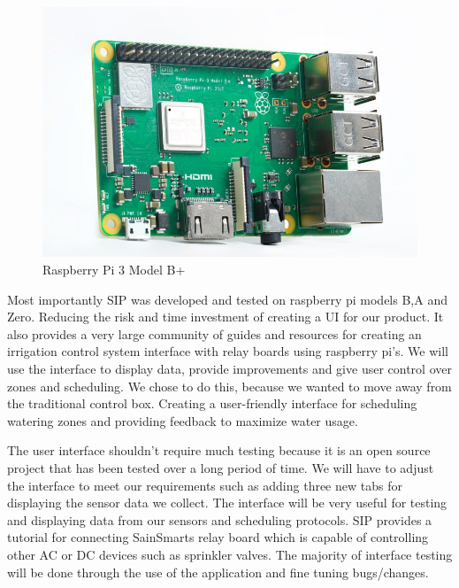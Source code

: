\documentclass[letterpaper, 10 pt, conference]{ieeeconf}  %
\begin{document}
\begin{figure}[H]
    \centering
    \includegraphics[scale=.32]{RaspberryPIB.jpg}
    \caption{Raspberry Pi 3 Model B+}
    \label{fig:my_label}
\end{figure}

Most importantly SIP was developed and tested on raspberry pi models B,A and Zero. Reducing the risk and time investment of creating a UI for our product. It also provides a very large community of guides and resources for creating an irrigation control system interface with relay boards using raspberry pi's. We will use the interface to display data, provide improvements and give user control over zones and scheduling. We chose to do this, because we wanted to move away from the traditional control box. Creating a user-friendly interface for scheduling watering zones and providing feedback to maximize water usage.

The user interface shouldn't require much testing because it is an open source project that has been tested over a long period of time. We will have to adjust the interface to meet our requirements such as adding three new tabs for displaying the sensor data we collect. The interface will be very useful for testing and displaying data from our sensors and scheduling protocols. SIP provides a tutorial for connecting SainSmarts relay board which is capable of controlling other AC or DC devices such as sprinkler valves. The majority of interface testing will be done through the use of the application and fine tuning bugs/changes.
\end{document}
